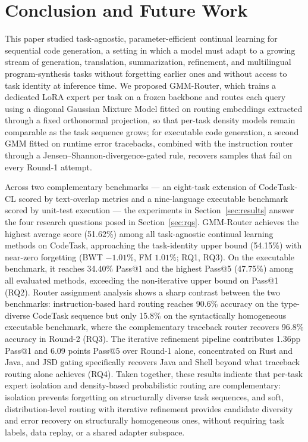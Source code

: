 \section{Conclusion and Future Work}
\label{sec:conclusion}

This paper studied task-agnostic, parameter-efficient continual learning for sequential code generation, a setting in which a model must adapt to a growing stream of generation, translation, summarization, refinement, and multilingual program-synthesis tasks without forgetting earlier ones and without access to task identity at inference time. We proposed GMM-Router, which trains a dedicated LoRA expert per task on a frozen backbone and routes each query using a diagonal Gaussian Mixture Model fitted on routing embeddings extracted through a fixed orthonormal projection, so that per-task density models remain comparable as the task sequence grows; for executable code generation, a second GMM fitted on runtime error tracebacks, combined with the instruction router through a Jensen--Shannon-divergence-gated rule, recovers samples that fail on every Round-1 attempt.

Across two complementary benchmarks --- an eight-task extension of CodeTask-CL scored by text-overlap metrics and a nine-language executable benchmark scored by unit-test execution --- the experiments in Section~\ref{sec:results} answer the four research questions posed in Section~\ref{sec:rqs}. GMM-Router achieves the highest average score (51.62\%) among all task-agnostic continual learning methods on CodeTask, approaching the task-identity upper bound (54.15\%) with near-zero forgetting (BWT $-1.01\%$, FM $1.01\%$; RQ1, RQ3). On the executable benchmark, it reaches 34.40\% Pass@1 and the highest Pass@5 (47.75\%) among all evaluated methods, exceeding the non-iterative upper bound on Pass@1 (RQ2). Router assignment analysis shows a sharp contrast between the two benchmarks: instruction-based hard routing reaches 90.6\% accuracy on the type-diverse CodeTask sequence but only 15.8\% on the syntactically homogeneous executable benchmark, where the complementary traceback router recovers 96.8\% accuracy in Round-2 (RQ3). The iterative refinement pipeline contributes 1.36pp Pass@1 and 6.09 points Pass@5 over Round-1 alone, concentrated on Rust and Java, and JSD gating specifically recovers Java and Shell beyond what traceback routing alone achieves (RQ4). Taken together, these results indicate that per-task expert isolation and density-based probabilistic routing are complementary: isolation prevents forgetting on structurally diverse task sequences, and soft, distribution-level routing with iterative refinement provides candidate diversity and error recovery on structurally homogeneous ones, without requiring task labels, data replay, or a shared adapter subspace.

